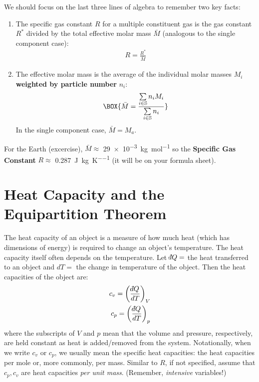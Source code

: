 We should focus on the last three lines of algebra to remember two key facts:
\begin{enumerate}
    \item The specific gas constant $R$ for a multiple constituent gas is the gas constant $R^*$ divided by the total effective molar mass $\bar{M}$ (analogous to the single component case):
    \begin{align}
        R=\frac{R^*}{\bar{M}}
    \end{align}
    \item The effective molar mass is the average of the individual molar masses $M_i$ \textbf{weighted by particle number} $n_i$:
    \begin{align}
        \BOX{\bar{M} =\frac{\sum\limits_{i\in\mathbb{S}} n_iM_i}{\sum\limits_{i\in\mathbb{S}} n_i}}
    \end{align}
    In the single component case, $\bar{M}=M_a$.
\end{enumerate}

For the Earth (excercise), $\bar{M}\approx$ \qty{29e-3}{\kilogram\per\mole} so the \textbf{Specific Gas Constant} $R\approx$ \qty{0.287}{\joule\per\kilogram\per\kelvin} (it will be on your formula sheet).


\section{Heat Capacity and the Equipartition Theorem}\label{Equipartition}

The heat capacity of an object is a measure of how much heat (which has dimensions of energy) is required to change an object's temperature. The heat capacity itself often depends on the temperature. Let $\dbar Q=$ the heat transferred to an object and $dT=$ the change in temperature of the object. Then the heat capacities of the object are:
\begin{align}
    c_v=\left(\frac{\dbar Q}{dT}\right)_V\\
    c_p=\left(\frac{\dbar Q}{dT}\right)_p
\end{align}
where the subscripts of $V$ and $p$ mean that the volume and pressure, respectively, are held constant as heat is added/removed from the system. Notationally, when we write $c_v$ or $c_p$, we usually mean the specific heat capacities: the heat capacities per mole or, more commonly, per mass. Similar to $R$, if not specified, assume that $c_p, c_v$ are heat capacities \textit{per unit mass}. (Remember, \textit{intensive} variables!)


